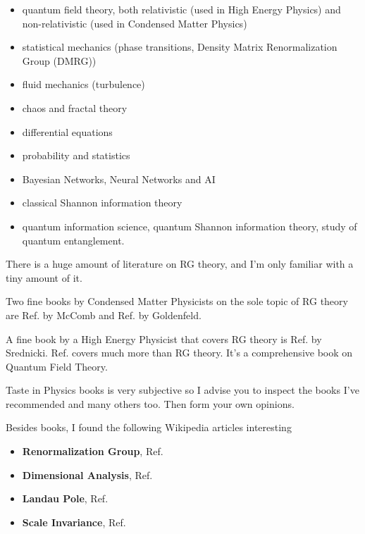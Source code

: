 \begin{itemize}
\item
quantum field theory,
both relativistic (used
in High Energy Physics) and
non-relativistic (used in Condensed Matter
Physics)

\item
statistical mechanics (phase transitions,
Density Matrix Renormalization Group (DMRG))

\item
fluid mechanics (turbulence)
\item
chaos and fractal theory
\item
differential equations

\item
probability and statistics

\item Bayesian Networks, Neural Networks and AI

\item classical Shannon information theory
\item quantum information science, quantum
Shannon information theory,
study of quantum entanglement.
\end{itemize}


There is a huge amount of
literature on RG theory,
and I'm only familiar with
a tiny amount of it.

Two fine books 
by Condensed Matter Physicists on
the sole topic of
RG theory 
  are
Ref.\cite{Mc} by McComb and Ref.\cite{Go} by Goldenfeld.

A fine book by a High Energy Physicist 
that covers RG theory is Ref.\cite{Sr}
by Srednicki. Ref.\cite{Sr}
covers much more than RG theory.
It's a comprehensive  
book on  Quantum Field Theory.


Taste in Physics books is very subjective so
I advise you to inspect the books
I've recommended
and many others too. Then
form your own opinions.

Besides books, I 
found the following 
Wikipedia articles interesting

\begin{itemize}

\item {\bf Renormalization Group},
Ref.\cite{wiki-rg}



\item {\bf Dimensional Analysis},
Ref.\cite{wiki-da}

\item {\bf Landau Pole},
Ref.\cite{wiki-landau-pole}

\item {\bf Scale Invariance},
Ref.\cite{wiki-scale-inv}


\end{itemize}

